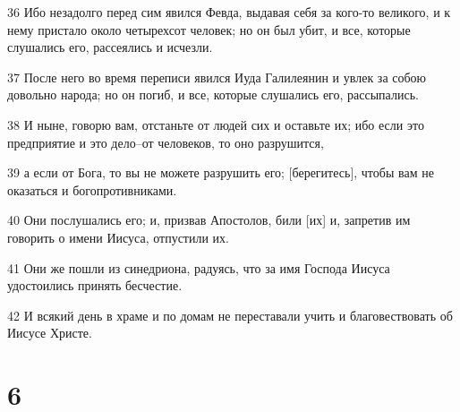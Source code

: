 \par 36 Ибо незадолго перед сим явился Февда, выдавая себя за кого-то великого, и к нему пристало около четырехсот человек; но он был убит, и все, которые слушались его, рассеялись и исчезли.
\par 37 После него во время переписи явился Иуда Галилеянин и увлек за собою довольно народа; но он погиб, и все, которые слушались его, рассыпались.
\par 38 И ныне, говорю вам, отстаньте от людей сих и оставьте их; ибо если это предприятие и это дело--от человеков, то оно разрушится,
\par 39 а если от Бога, то вы не можете разрушить его; [берегитесь], чтобы вам не оказаться и богопротивниками.
\par 40 Они послушались его; и, призвав Апостолов, били [их] и, запретив им говорить о имени Иисуса, отпустили их.
\par 41 Они же пошли из синедриона, радуясь, что за имя Господа Иисуса удостоились принять бесчестие.
\par 42 И всякий день в храме и по домам не переставали учить и благовествовать об Иисусе Христе.

\chapter{6}

